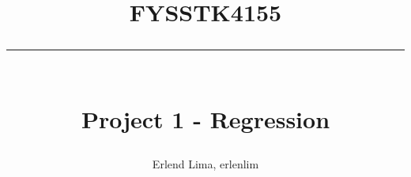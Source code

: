\newcommand{\horrule}[1]{\rule{\linewidth}{#1}} %

\title{
\large \textsc{FYSSTK4155} \\ [25pt]
\horrule{0.5pt} \\[0.4cm]
\huge Project 1 - Regression}

\author{Erlend Lima, erlenlim}

